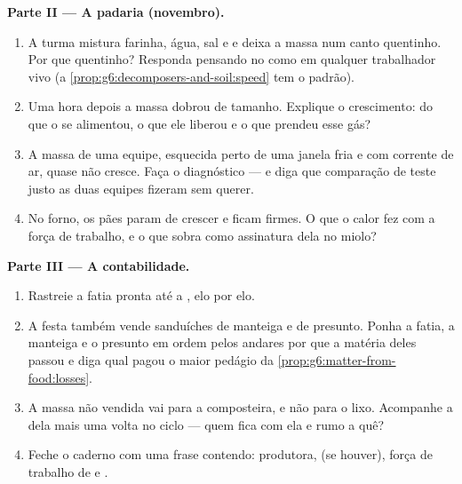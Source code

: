 \begin{problem}
\medskip\noindent\textbf{Parte II --- A padaria (novembro).}
\begin{enumerate}[resume]
  \item A turma mistura farinha, água, sal e  e deixa a massa
        num canto quentinho. Por que quentinho? Responda pensando no
         como em qualquer trabalhador vivo (a
        \cref{prop:g6:decomposers-and-soil:speed} tem o padrão).
  \item Uma hora depois a massa dobrou de tamanho. Explique o
        crescimento: do que o  se alimentou, o que ele
        liberou e o que prendeu esse gás?
  \item A massa de uma equipe, esquecida perto de uma janela fria e
        com corrente de ar, quase não cresce. Faça o diagnóstico ---
        e diga que comparação de teste justo as duas equipes fizeram
        sem querer.
  \item No forno, os pães param de crescer e ficam firmes. O que o
        calor fez com a força de trabalho, e o que sobra como
        assinatura dela no miolo?
\end{enumerate}

\medskip\noindent\textbf{Parte III --- A contabilidade.}
\begin{enumerate}[resume]
  \item Rastreie a fatia pronta até a , elo por elo.
  \item A festa também vende sanduíches de manteiga e de presunto.
        Ponha a fatia, a manteiga e o presunto em ordem pelos andares
        por que a matéria deles passou e diga qual pagou o maior
        pedágio da \cref{prop:g6:matter-from-food:losses}.
  \item A massa não vendida vai para a composteira, e não para o
        lixo. Acompanhe a  dela mais uma volta no
        ciclo --- quem fica com ela e rumo a quê?
  \item Feche o caderno com uma frase contendo: produtora, 
        (se houver), força de trabalho de  e .
\end{enumerate}
\end{problem}
